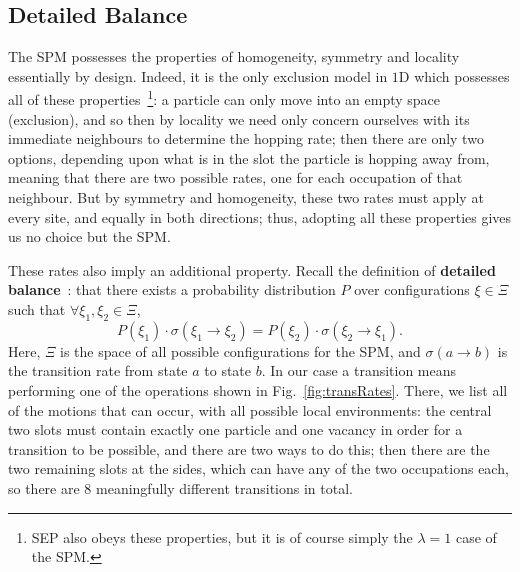 \subsection{Detailed Balance} \label{sec:dbProof}
The SPM possesses the properties of homogeneity, symmetry and locality essentially by design. Indeed, it is
the only exclusion model in $1$D which possesses all of these
properties~\footnote{SEP also obeys these properties, but it is of course 
simply the $\lambda=1$ case of the SPM.}: a particle can only move into
an empty space (exclusion), and so then by locality we need only concern ourselves with its immediate 
neighbours to determine the hopping rate; then there are only two options, depending upon what is in the 
slot the particle is hopping away from, meaning that there are two possible rates, one for each occupation
of that neighbour. But by symmetry and homogeneity, these two rates must apply at every site, and equally
in both directions; thus, adopting all these properties gives us no choice but the SPM.

These rates also imply an additional property. Recall the definition of 
\textbf{detailed balance}~\cite{gardiner1985}:
that there exists
a probability distribution $P$ over configurations $\xi \in \Xi$ such that 
$\forall \xi_1 , \xi_2 \in \Xi $,
  \begin{equation} \label{eq:dbDefn}
    P(\xi_1) \cdot \sigma(\xi_1 \rightarrow \xi_2) = P(\xi_2) \cdot \sigma(\xi_2 \rightarrow \xi_1).
  \end{equation}  
Here, $\Xi$ is the space of all possible configurations for the SPM, and 
$\sigma(a \rightarrow b)$ is the transition rate from state $a$ to state $b$. In our case a transition
means performing one of the operations shown in Fig.~\ref{fig:transRates}. There,
we
list all of the motions that can occur, with all possible local environments: the central two slots must
contain exactly one particle and one vacancy in order for a transition to be possible, and there are two
ways to do this; then there are the two remaining slots at the sides, which can have any of the two
occupations each, so there are $8$ meaningfully different transitions in total.

